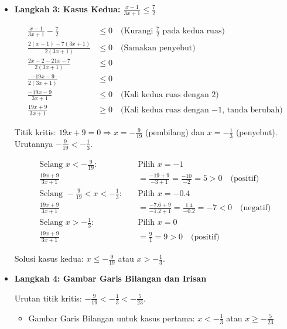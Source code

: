 \documentclass[10pt,a4paper]{article}
\newcounter{eqblock}
\newcommand{\reseteq}{%
  \stepcounter{eqblock}%
  \setcounter{equation}{0}%
  \renewcommand{\theHequation}{\arabic{eqblock}.\arabic{equation}}%
}
\begin{document}
\begin{enumerate}
\begin{itemize}
\begin{itemize}
Solusi kasus pertama: $x < -\frac{1}{3}$ atau $x \geq -\frac{5}{23}$.

\item \textbf{Langkah 3: Kasus Kedua: $\frac{x-1}{3x+1} \leq \frac{7}{2}$}

\reseteq
\begin{align}
\frac{x-1}{3x+1} - \frac{7}{2} &\leq 0 \quad \text{(Kurangi $\frac{7}{2}$ pada kedua ruas)} \\
\frac{2(x-1) - 7(3x+1)}{2(3x+1)} &\leq 0 \quad \text{(Samakan penyebut)} \\
\frac{2x-2 - 21x-7}{2(3x+1)} &\leq 0 \\
\frac{-19x-9}{2(3x+1)} &\leq 0 \\
\frac{-19x-9}{3x+1} &\leq 0 \quad \text{(Kali kedua ruas dengan 2)} \\
\frac{19x+9}{3x+1} &\geq 0 \quad \text{(Kali kedua ruas dengan $-1$, tanda berubah)}
\end{align}

Titik kritis: $19x + 9 = 0 \Rightarrow x = -\frac{9}{19}$ (pembilang) dan $x = -\frac{1}{3}$ (penyebut).
Urutannya $-\frac{9}{19} < -\frac{1}{3}$.

\reseteq
\begin{align}
\text{Selang } x < -\frac{9}{19}: \quad &\text{Pilih } x = -1 \\
\frac{19x+9}{3x+1} &= \frac{-19+9}{-3+1} = \frac{-10}{-2} = 5 > 0 \quad \text{(positif)} \\
\text{Selang } -\frac{9}{19} < x < -\frac{1}{3}: \quad &\text{Pilih } x = -0.4 \\
\frac{19x+9}{3x+1} &= \frac{-7.6+9}{-1.2+1} = \frac{1.4}{-0.2} = -7 < 0 \quad \text{(negatif)} \\
\text{Selang } x > -\frac{1}{3}: \quad &\text{Pilih } x = 0 \\
\frac{19x+9}{3x+1} &= \frac{9}{1} = 9 > 0 \quad \text{(positif)}
\end{align}

Solusi kasus kedua: $x \leq -\frac{9}{19}$ atau $x > -\frac{1}{3}$.

\item \textbf{Langkah 4: Gambar Garis Bilangan dan Irisan}

Urutan titik kritis: $-\frac{9}{19} < -\frac{1}{3} < -\frac{5}{23}$.

\begin{itemize}
\item Gambar Garis Bilangan untuk kasus pertama: $x < -\frac{1}{3}$ atau $x \geq -\frac{5}{23}$
\begin{center}
\begin{tikzpicture}[scale=0.8]


\end{tikzpicture}
\end{center}
\end{itemize}
\end{itemize}
\end{itemize}
\end{enumerate}
\end{document}
